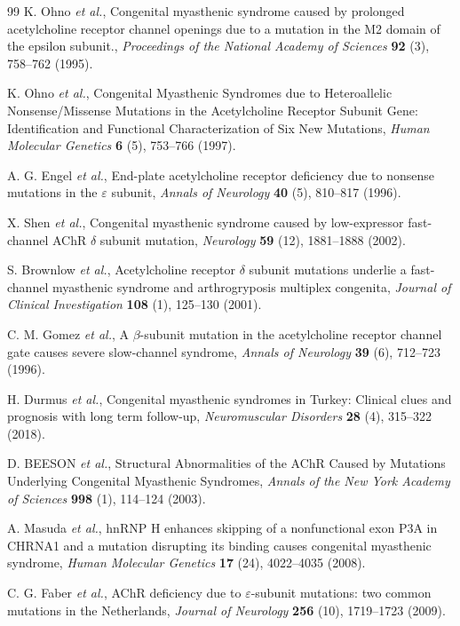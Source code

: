 \documentclass{ws-procs11x85}
\begin{document}
\begin{thebibliography}{99}
K. Ohno {\em et al.}, Congenital myasthenic syndrome caused by prolonged acetylcholine receptor channel openings due to a mutation in the M2 domain of the epsilon subunit., {\em Proceedings of the National Academy of Sciences} {\bf 92} (3), 758--762 (1995).

K. Ohno {\em et al.}, Congenital Myasthenic Syndromes due to Heteroallelic Nonsense/Missense Mutations in the Acetylcholine Receptor   Subunit Gene: Identification and Functional Characterization of Six New Mutations, {\em Human Molecular Genetics} {\bf 6} (5), 753--766 (1997).

A. G. Engel {\em et al.}, End-plate acetylcholine receptor deficiency due to nonsense mutations in the $\varepsilon$ subunit, {\em Annals of Neurology} {\bf 40} (5), 810--817 (1996).

X. Shen {\em et al.}, Congenital myasthenic syndrome caused by low-expressor fast-channel AChR $\delta$ subunit mutation, {\em Neurology} {\bf 59} (12), 1881--1888 (2002).

S. Brownlow {\em et al.}, Acetylcholine receptor $\delta$ subunit mutations underlie a fast-channel myasthenic syndrome and arthrogryposis multiplex congenita, {\em Journal of Clinical Investigation} {\bf 108} (1), 125--130 (2001).

C. M. Gomez {\em et al.}, A $\beta$-subunit mutation in the acetylcholine receptor channel gate causes severe slow-channel syndrome, {\em Annals of Neurology} {\bf 39} (6), 712--723 (1996).

H. Durmus {\em et al.}, Congenital myasthenic syndromes in Turkey: Clinical clues and prognosis with long term follow-up, {\em Neuromuscular Disorders} {\bf 28} (4), 315--322 (2018).

D. BEESON {\em et al.}, Structural Abnormalities of the AChR Caused by Mutations Underlying Congenital Myasthenic Syndromes, {\em Annals of the New York Academy of Sciences} {\bf 998} (1), 114--124 (2003).

A. Masuda {\em et al.}, hnRNP H enhances skipping of a nonfunctional exon P3A in CHRNA1 and a mutation disrupting its binding causes congenital myasthenic syndrome, {\em Human Molecular Genetics} {\bf 17} (24), 4022--4035 (2008).

C. G. Faber {\em et al.}, AChR deficiency due to $\varepsilon$-subunit mutations: two common mutations in the Netherlands, {\em Journal of Neurology} {\bf 256} (10), 1719--1723 (2009).


\end{thebibliography}
\end{document}
